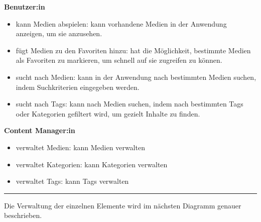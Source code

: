 





\textbf{Benutzer:in}
\begin{itemize}
    \item kann Medien abspielen: kann vorhandene Medien in der Anwendung anzeigen, um sie anzusehen.
    \item fügt Medien zu den Favoriten hinzu: hat die Möglichkeit, bestimmte Medien als Favoriten zu markieren, um schnell auf sie zugreifen zu können.
    \item sucht nach Medien: kann in der Anwendung nach bestimmten Medien suchen, indem Suchkriterien eingegeben werden.
    \item sucht nach Tags: kann nach Medien suchen, indem nach bestimmten Tags oder Kategorien gefiltert wird, um gezielt Inhalte zu finden.
\end{itemize}
\textbf{Content Manager:in}
\begin{itemize}
    \item verwaltet Medien: kann Medien verwalten
    \item verwaltet Kategorien: kann Kategorien verwalten
    \item verwaltet Tags: kann Tags verwalten
\end{itemize}

\rule{\linewidth}{0.3pt}

Die Verwaltung der einzelnen Elemente wird im nächsten Diagramm genauer beschrieben.

